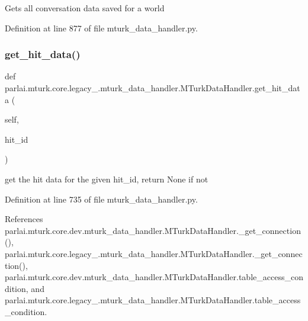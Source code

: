 \begin{DoxyVerb}Gets all conversation data saved for a world\end{DoxyVerb}
 

Definition at line 877 of file mturk\+\_\+data\+\_\+handler.\+py.

\mbox{\label{classparlai_1_1mturk_1_1core_1_1legacy__2018_1_1mturk__data__handler_1_1MTurkDataHandler_af5022ecc9bec7461912ae7439d6543cc}} 
\subsubsection{\texorpdfstring{get\+\_\+hit\+\_\+data()}{get\_hit\_data()}}
{\footnotesize\ttfamily def parlai.\+mturk.\+core.\+legacy\+\_.\+mturk\+\_\+data\+\_\+handler.\+M\+Turk\+Data\+Handler.\+get\+\_\+hit\+\_\+data (\begin{DoxyParamCaption}\item[{}]{self,  }\item[{}]{hit\+\_\+id }\end{DoxyParamCaption})}

\begin{DoxyVerb}get the hit data for the given hit_id, return None if not\end{DoxyVerb}
 

Definition at line 735 of file mturk\+\_\+data\+\_\+handler.\+py.



References parlai.\+mturk.\+core.\+dev.\+mturk\+\_\+data\+\_\+handler.\+M\+Turk\+Data\+Handler.\+\_\+get\+\_\+connection(), parlai.\+mturk.\+core.\+legacy\+\_.\+mturk\+\_\+data\+\_\+handler.\+M\+Turk\+Data\+Handler.\+\_\+get\+\_\+connection(), parlai.\+mturk.\+core.\+dev.\+mturk\+\_\+data\+\_\+handler.\+M\+Turk\+Data\+Handler.\+table\+\_\+access\+\_\+condition, and parlai.\+mturk.\+core.\+legacy\+\_.\+mturk\+\_\+data\+\_\+handler.\+M\+Turk\+Data\+Handler.\+table\+\_\+access\+\_\+condition.

